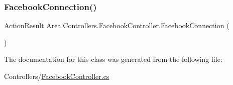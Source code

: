 \subsubsection{\texorpdfstring{Facebook\+Connection()}{FacebookConnection()}}
{\footnotesize\ttfamily Action\+Result Area.\+Controllers.\+Facebook\+Controller.\+Facebook\+Connection (\begin{DoxyParamCaption}{ }\end{DoxyParamCaption})\hspace{0.3cm}{\ttfamily [inline]}}



The documentation for this class was generated from the following file\+:\begin{DoxyCompactItemize}
\item 
Controllers/\mbox{\hyperlink{FacebookController_8cs}{Facebook\+Controller.\+cs}}\end{DoxyCompactItemize}
